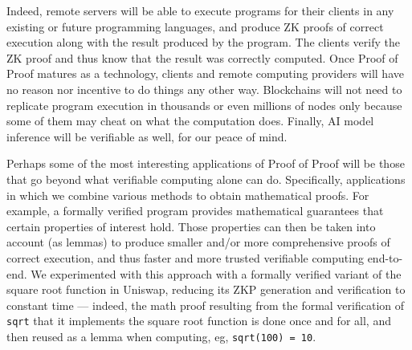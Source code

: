 \documentclass{article}
\theoremstyle{plain}
\theoremstyle{definition}
\newcommand{\code}[1]{\texttt{#1}\xspace}
\begin{document}
Indeed, remote servers will be able to execute programs for their clients in any existing or future programming languages, and produce ZK proofs of correct execution along with the result produced by the program.  The clients verify the ZK proof and thus know that the result was correctly computed.  Once Proof of Proof matures as a technology, clients and remote computing providers will have no reason nor incentive to do things any other way.
Blockchains will not need to replicate program execution in thousands or even millions of nodes only because some of them may cheat on what the computation does. Finally, AI model inference will be verifiable as well, for our peace of mind.

Perhaps some of the most interesting applications of Proof of Proof will be those that go beyond what verifiable computing alone can do.  Specifically, applications in which we combine various methods to obtain mathematical proofs.  For example, a formally verified program provides mathematical guarantees that certain properties of interest hold.  Those properties can then be taken into account (as lemmas) to produce smaller and/or more comprehensive proofs of correct execution, and thus faster and more trusted verifiable computing end-to-end.  We experimented with this approach with a formally verified variant of the square root function in Uniswap, reducing its ZKP generation and verification to constant time --- indeed, the math proof resulting from the formal verification of \code{sqrt} that it implements the square root function is done once and for all, and then reused as a lemma when computing, eg, \code{sqrt(100) = 10}.
\end{document}

